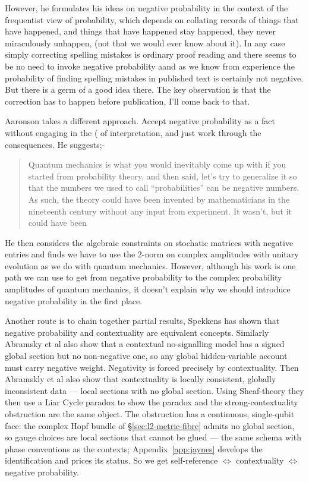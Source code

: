 However, he formulates his ideas on negative probability in the context of the frequentist view of probability, which depends  on collating records of things that have happened, and things that have happened stay happened, they never miraculously unhappen, (not that we would ever know about it). In any case simply correcting spelling mistakes is ordinary proof reading and there seems to be no need to invoke negative probability aand as we know from experience the probability of finding spelling mistakes in published text is certainly not negative. But there is a germ of a good idea there. The key observation is that the correction has to happen before publication, I'll come back to that. 

Aaronson \autocite{aaronson_lect9, Aaronson:dem} takes a different approach. Accept negative probability as a fact without engaging in  the (\autocite{Cardano_1545} of interpretation, and just work through the consequences. He suggests;-
\begin{quotation}
    Quantum mechanics is what you would inevitably come up with if you started from probability theory, and then said, let's try to generalize it so that the numbers we used to call “probabilities” can be negative numbers. As such, the theory could have been invented by mathematicians in the nineteenth century without any input from experiment. It wasn't, but it could have been
     \par
  \hfill \autocite{Aaronson:dem}
\end{quotation}
He then considers the algebraic constraints on stochatic matrices with negative entries and finds we have to use the 2-norm on complex amplitudes with unitary evolution as we do with quantum mechanics.
However, although his work is one path we can use to get from negative probability to the complex probability amplitudes of quantum mechanics, it doesn't explain why we should introduce negative probability in the first place. 

Another route is to chain together partial results, Spekkens \autocite{spekkens2008negativity} has shown that negative probability and contextuality are equivalent concepts. Similarly Abramsky et al \autocite{Abramsky2014} also show that a contextual no-signalling model has a signed global section but no non-negative one, so any global hidden-variable account must carry negative weight. Negativity is forced precisely by contextuality. Then Abramskly et al \autocite{Abramsky2015} also show that contextuality is locally consistent, globally inconsistent data — local sections with no global section. Using Sheaf-theory they then use a Liar Cycle paradox to show the paradox and the strong-contextuality obstruction are the same object. The obstruction has a continuous, single-qubit face: the complex Hopf bundle of \S\ref{sec:l2-metric-fibre} admits no global section, so gauge choices are local sections that cannot be glued --- the same schema with phase conventions as the contexts; Appendix~\ref{app:jaynes} develops the identification and prices its status. So we get self-reference  $\iff$ contextuality $\iff$ negative probability. 

